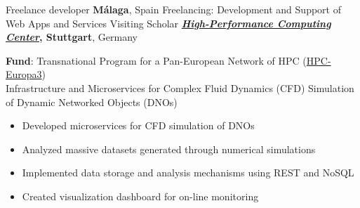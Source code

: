 \documentclass[
  a4paper
]{../FortySecondsCV/fortysecondscv}
\renewcommand{\emph}[1]{\textcolor{cyan!75!black!120}{\textbf{#1}}}
\begin{document}
\begin{cvtable}[1]
         {Freelance developer}
         {\emph{M{\'a}laga}, Spain}
         {
         Freelancing: Development and Support of Web Apps and Services
         {\scriptsize
         }
       }
         {Visiting Scholar}
         {\emph{\href{http://www.hlrs.de}{{\it High-Performance Computing Center}}, Stuttgart}, Germany}%
         {
          {\scriptsize \emph{Fund}: { Transnational Program for a Pan-European Network of HPC} (\href{http://www.hpc-europa.eu/}{HPC-Europa3})}\\
          Infrastructure and Microservices for Complex Fluid Dynamics (CFD) Simulation of Dynamic Networked Objects (DNOs)
          {\footnotesize \setlength\parindent{0pt}\setlength{\parskip}{-1.em}
            \begin{itemize}[leftmargin=*]\setlength\itemsep{-.5em}
            \item Developed microservices for CFD simulation of DNOs
            \item Analyzed massive datasets generated through numerical simulations %
            \item Implemented data storage and analysis mechanisms using REST and NoSQL
            \item Created visualization dashboard for on-line monitoring
            \end{itemize}
          }
          {\scriptsize
}}
\end{cvtable}
\end{document}
